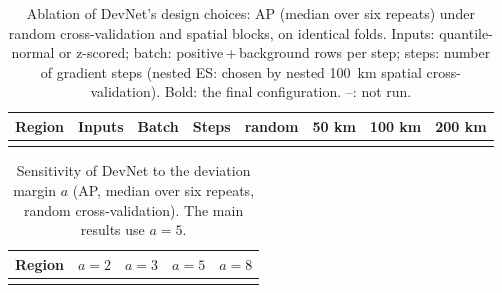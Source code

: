 \documentclass[pdflatex,sn-apa]{sn-jnl}
\begin{document}
\begin{appendices}
\begin{table}[!h]
\caption{Ablation of DevNet's design choices: AP (median over six repeats) under random cross-validation and spatial blocks, on identical folds. Inputs: quantile-normal or z-scored; batch: positive\,+\,background rows per step; steps: number of gradient steps (nested ES: chosen by nested 100~km spatial cross-validation). Bold: the final configuration. --: not run.}\label{tab:ablation}
\scriptsize
\setlength{\tabcolsep}{2.5pt}
\begin{tabular*}{\textwidth}{@{\extracolsep\fill}llllllll}
\toprule
Region & Inputs & Batch & Steps & random & 50 km & 100 km & 200 km \\
\midrule
\botrule
\end{tabular*}
\end{table}

\begin{table}[!h]
\caption{Sensitivity of DevNet to the deviation margin $a$ (AP, median over six repeats, random cross-validation). The main results use $a = 5$.}\label{tab:margin}
\footnotesize
\begin{tabular*}{0.7\textwidth}{@{\extracolsep\fill}lcccc}
\toprule
Region & $a = 2$ & $a = 3$ & $a = 5$ & $a = 8$ \\
\midrule
\botrule
\end{tabular*}
\end{table}

\end{appendices}

\clearpage


\end{document}
